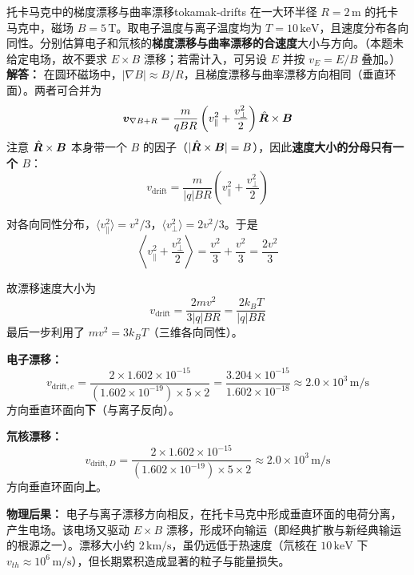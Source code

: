 \begin{example}{托卡马克中的梯度漂移与曲率漂移}{tokamak-drifts}
在一大环半径 $R=2\,\mathrm{m}$ 的托卡马克中，磁场 $B=5\,\mathrm{T}$。取电子温度与离子温度均为 $T=10\,\mathrm{keV}$，且速度分布各向同性。分别估算电子和氘核的\textbf{梯度漂移与曲率漂移的合速度}大小与方向。（本题未给定电场，故不要求 $E\times B$ 漂移；若需计入，可另设 $E$ 并按 $v_E=E/B$ 叠加。）
\tcblower
\textbf{解答：}
在圆环磁场中，$|\nabla B|\approx B/R$，且梯度漂移与曲率漂移方向相同（垂直环面）。两者可合并为
\[
\bm{v}_{\nabla B+R} = \frac{m}{qBR}\left(v_{\parallel}^2 + \frac{v_{\perp}^2}{2}\right)\hat{\bm{R}}\times\bm{B}
\]
注意 $\hat{\bm{R}}\times\bm{B}$ 本身带一个 $B$ 的因子（$|\hat{\bm{R}}\times\bm{B}|=B$），因此\textbf{速度大小的分母只有一个 $B$}：
\[
v_{\text{drift}} = \frac{m}{|q|BR}\left(v_{\parallel}^2 + \frac{v_{\perp}^2}{2}\right)
\]

对各向同性分布，$\langle v_{\parallel}^2\rangle = v^2/3$，$\langle v_{\perp}^2\rangle = 2v^2/3$。于是
\[
\left\langle v_{\parallel}^2 + \frac{v_{\perp}^2}{2}\right\rangle = \frac{v^2}{3} + \frac{v^2}{3} = \frac{2v^2}{3}
\]

故漂移速度大小为
\[
v_{\text{drift}} = \frac{2mv^2}{3|q|BR} = \frac{2k_{\!B}T}{|q|BR}
\]
最后一步利用了 $mv^2 = 3k_{\!B}T$（三维各向同性）。

\textbf{电子漂移：}
\[
v_{\text{drift},e} = \frac{2\times 1.602\times 10^{-15}}{(1.602\times 10^{-19})\times 5\times 2} = \frac{3.204\times 10^{-15}}{1.602\times 10^{-18}} \approx 2.0\times 10^{3}\,\mathrm{m/s}
\]
方向垂直环面向\textbf{下}（与离子反向）。

\textbf{氘核漂移：}
\[
v_{\text{drift},D} = \frac{2\times 1.602\times 10^{-15}}{(1.602\times 10^{-19})\times 5\times 2} \approx 2.0\times 10^{3}\,\mathrm{m/s}
\]
方向垂直环面向\textbf{上}。

\textbf{物理后果：} 电子与离子漂移方向相反，在托卡马克中形成垂直环面的电荷分离，产生电场。该电场又驱动 $E\times B$ 漂移，形成环向输运（即经典扩散与新经典输运的根源之一）。漂移大小约 $2\,\mathrm{km/s}$，虽仍远低于热速度（氘核在 $10\,\mathrm{keV}$ 下 $v_{th}\approx 10^{6}\,\mathrm{m/s}$），但长期累积造成显著的粒子与能量损失。
\end{example}

